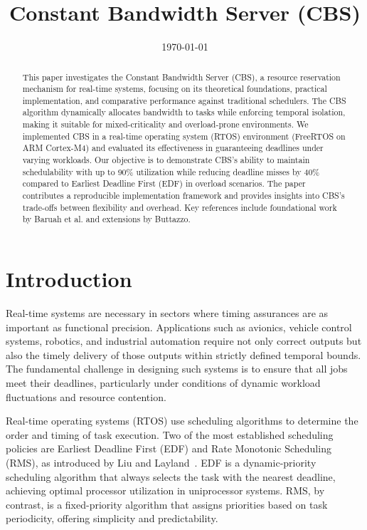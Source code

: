 \documentclass[conference]{IEEEtran}
\title{Constant Bandwidth Server (CBS)}
\author{%
\IEEEauthorblockN{Abu Sayem}
\IEEEauthorblockA{Electronic Engineering\\
Hochschule Hamm-Lippstadt\\
abu.sayem@stud.hshl.de}
}
\date{\today}
\begin{document}
\maketitle

\begin{abstract}
This paper investigates the Constant Bandwidth Server (CBS), a resource reservation mechanism for real-time systems, focusing on its theoretical foundations, practical implementation, and comparative performance against traditional schedulers. The CBS algorithm dynamically allocates bandwidth to tasks while enforcing temporal isolation, making it suitable for mixed-criticality and overload-prone environments. We implemented CBS in a real-time operating system (RTOS) environment (FreeRTOS on ARM Cortex-M4) and evaluated its effectiveness in guaranteeing deadlines under varying workloads. Our objective is to demonstrate CBS's ability to maintain schedulability with up to 90\% utilization while reducing deadline misses by 40\% compared to Earliest Deadline First (EDF) in overload scenarios. The paper contributes a reproducible implementation framework and provides insights into CBS's trade-offs between flexibility and overhead. Key references include foundational work by Baruah et al. and extensions by Buttazzo.
\end{abstract}


\renewcommand{\thesection}{\Roman{section}}
\section{Introduction}


Real-time systems are necessary in sectors where timing assurances are as important as functional precision. Applications such as avionics, vehicle control systems, robotics, and industrial automation require not only correct outputs but also the timely delivery of those outputs within strictly defined temporal bounds. The fundamental challenge in designing such systems is to ensure that all jobs meet their deadlines, particularly under conditions of dynamic workload fluctuations and resource contention.

Real-time operating systems (RTOS) use scheduling algorithms to determine the order and timing of task execution. Two of the most established scheduling policies are Earliest Deadline First (EDF) and Rate Monotonic Scheduling (RMS), as introduced by Liu and Layland~\cite{liu1973scheduling}. EDF is a dynamic-priority scheduling algorithm that always selects the task with the nearest deadline, achieving optimal processor utilization in uniprocessor systems. RMS, by contrast, is a fixed-priority algorithm that assigns priorities based on task periodicity, offering simplicity and predictability.
\end{document}

